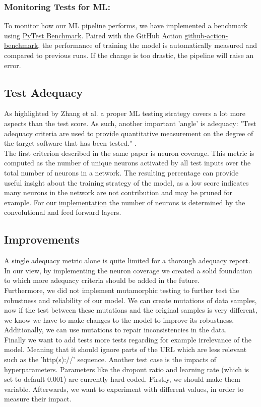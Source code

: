 \subsubsection{Monitoring Tests for ML:} To monitor how our ML pipeline performs, we have implemented a benchmark using 
{\color{blue} \href{https://pypi.org/project/pytest-benchmark/}{PyTest Benchmark}}. Paired with the GitHub Action {\color{blue} \href{https://github.com/benchmark-action/github-action-benchmark/tree/master}{github-action-benchmark}}, the performance of training the model is automatically measured and compared to previous runs. If the change is too drastic, the pipeline will raise an error.

\subsection{Test Adequacy}
As highlighted by Zhang et al. \cite{zhang2019machine} a proper ML testing strategy covers a lot more aspects than the test score. As such, another important 'angle' is adequacy: "Test adequacy criteria are used to provide quantitative measurement on the degree of the target software that has been tested." \cite{zhang2019machine}. \\
The first criterion described in the same paper is neuron coverage. This metric is computed as the number of unique neurons activated by all test inputs over the total number of neurons in a network. The resulting percentage can provide useful insight about the training strategy of the model, as a low score indicates many neurons in the network are not contribution and may be pruned for example.
For our {\color{blue} \href{https://github.com/remla24-team12/model-training/blob/main/tests/adequacy/test_neuron_coverage.py}{implementation}} the number of neurons is determined by the convolutional and feed forward layers.

\subsection{Improvements}
A single adequacy metric alone is quite limited for a thorough adequacy report. In our view, by implementing the neuron coverage we created a solid foundation to which more adequacy criteria should be added in the future.  \\
Furthermore, we did not implement mutamorphic testing to further test the robustness and reliability of our model. We can create mutations of data samples, now if the test between these mutations and the original samples is very different, we know we have to make changes to the model to improve its robustness. Additionally, we can use mutations to repair inconsistencies in the data. \\
Finally we want to add tests more tests regarding for example irrelevance of the model. Meaning that it should ignore parts of the URL which are less relevant such as the 'http(s)://' sequence. Another test case is the impacts of hyperparameters. Parameters like the dropout ratio and learning rate (which is set to default 0.001) are currently hard-coded. Firstly, we should make them variable. Afterwards, we want to experiment with different values, in order to measure their impact.